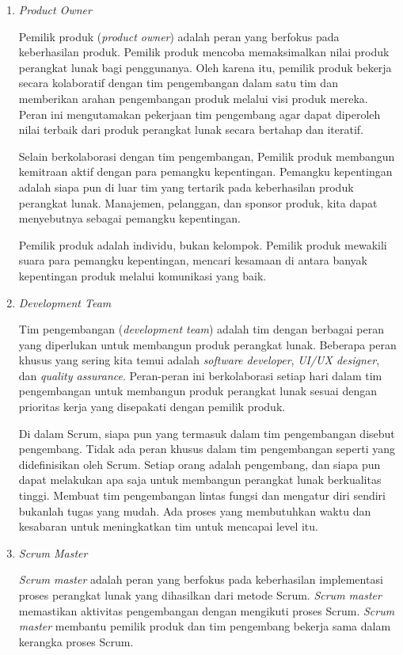 \begin{enumerate}
	\item \textit{Product Owner}
	
	Pemilik produk (\textit{product owner}) adalah peran yang berfokus pada keberhasilan produk. Pemilik produk mencoba memaksimalkan nilai produk perangkat lunak bagi penggunanya. Oleh karena itu, pemilik produk bekerja secara kolaboratif dengan tim pengembangan dalam satu tim dan memberikan arahan pengembangan produk melalui visi produk mereka. Peran ini mengutamakan pekerjaan tim pengembang agar dapat diperoleh nilai terbaik dari produk perangkat lunak secara bertahap dan iteratif. 

Selain berkolaborasi dengan tim pengembangan, Pemilik produk membangun kemitraan aktif dengan para pemangku kepentingan. Pemangku kepentingan adalah siapa pun di luar tim yang tertarik pada keberhasilan produk perangkat lunak. Manajemen, pelanggan, dan sponsor produk, kita dapat menyebutnya sebagai pemangku kepentingan.

Pemilik produk adalah individu, bukan kelompok. Pemilik produk mewakili suara para pemangku kepentingan, mencari kesamaan di antara banyak kepentingan produk melalui komunikasi yang baik.

	\item \textit{Development Team}
	
	Tim pengembangan (\textit{development team}) adalah tim dengan berbagai peran yang diperlukan untuk membangun produk perangkat lunak. Beberapa peran khusus yang sering kita temui adalah \textit{software developer}, \textit{UI/UX designer}, dan \textit{quality assurance}. Peran-peran ini berkolaborasi setiap hari dalam tim pengembangan untuk membangun produk perangkat lunak sesuai dengan prioritas kerja yang disepakati dengan pemilik produk.

Di dalam Scrum, siapa pun yang termasuk dalam tim pengembangan disebut pengembang. Tidak ada peran khusus dalam tim pengembangan seperti yang didefinisikan oleh Scrum. Setiap orang adalah pengembang, dan siapa pun dapat melakukan apa saja untuk membangun perangkat lunak berkualitas tinggi. Membuat tim pengembangan lintas fungsi dan mengatur diri sendiri bukanlah tugas yang mudah. Ada proses yang membutuhkan waktu dan kesabaran untuk meningkatkan tim untuk mencapai level itu.

	\item \textit{Scrum Master}
	
	\textit{Scrum master} adalah peran yang berfokus pada keberhasilan implementasi proses perangkat lunak yang dihasilkan dari metode Scrum. \textit{Scrum master} memastikan aktivitas pengembangan dengan mengikuti proses Scrum. \textit{Scrum master} membantu pemilik produk dan tim pengembang bekerja sama dalam kerangka proses Scrum.


\end{enumerate}
